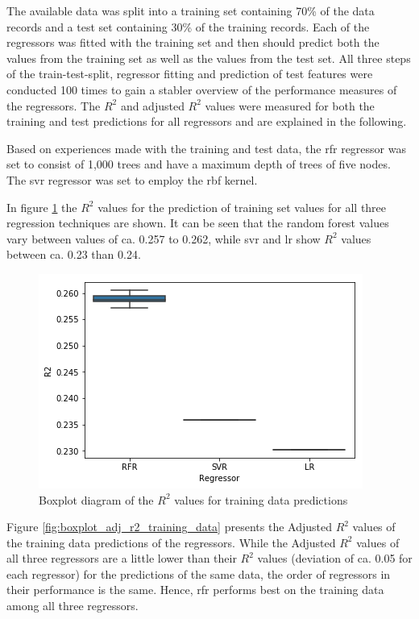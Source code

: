 \documentclass[a4paper, 11pt, oneside]{Thesis}  %
\begin{document}
The available data was split into a training set containing 70\% of the data records and a test set containing 30\% of the training records. Each of the regressors was fitted with the training set and then should predict both the values from the training set as well as the values from the test set. All three steps of the train-test-split, regressor fitting and prediction of test features were conducted 100 times to gain a stabler overview of the performance measures of the regressors. The $R^2$ and adjusted $R^2$ values were measured for both the training and test predictions for all regressors and are explained in the following.

Based on experiences made with the training and test data, the \ac{rfr} regressor was set to consist of 1,000 trees and have a maximum depth of trees of five nodes. The \ac{svr} regressor was set to employ the \ac{rbf} kernel.

In figure \ref{fig:boxplot_r2_training_data} the $R^2$ values for the prediction of training set values for all three regression techniques are shown. It can be seen that the random forest values vary between values of ca. 0.257 to 0.262, while \ac{svr} and \ac{lr} show $R^2$ values between ca. 0.23 than 0.24.

\begin{figure}[h]
\includegraphics[scale=0.7]{Figures/Regressor_comparison/boxplot_r2_training_data.png}
\centering
\caption{Boxplot diagram of the $R^2$ values for training data predictions}
\label{fig:boxplot_r2_training_data}
\end{figure}

Figure \ref{fig:boxplot_adj_r2_training_data} presents the Adjusted $R^2$ values of the training data predictions of the regressors. While the Adjusted $R^2$  values of all three regressors are a little lower than their $R^2$ values (deviation of ca. 0.05 for each regressor) for the predictions of the same data, the order of regressors in their performance is the same. Hence, \ac{rfr} performs best on the training data among all three regressors.
\end{document}
